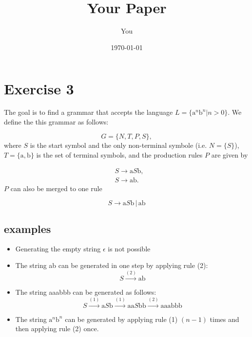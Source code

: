 \documentclass[a4paper]{article}
\title{Your Paper}
\author{You}
\date{\today}
\begin{document}
\section*{Exercise 3}
The goal is to find a grammar that accepts the language $L = \{\text{a}^n\text{b}^n \vert n > 0\}$. 
We define the this grammar as follows:

$$G = \{N, T, P, S\},$$
where $S$ is the start symbol and the only non-terminal symbole (i.e. $N = \{S\}$), $T = \{\text{a},\text{b}\}$ is the set of terminal symbols, and the production rules $P$ are given by

\begin{align}
 &S \longrightarrow \text{a}S\text{b}, \\
 &S \longrightarrow \text{ab}.
\end{align}
$P$ can also be merged to one rule

$$S \longrightarrow \text{a}S\text{b} \, \vert \, \text{ab}$$

\subsection*{examples}
\begin{itemize}
 \item Generating the empty string $\epsilon$ is not possible
 \item The string ab can be generated in one step by applying rule (2): $$S \stackrel{(2)}{\longrightarrow} \text{ab}$$
 \item The string aaabbb can be generated as follows: $$S \stackrel{(1)}{\longrightarrow} \text{a}S\text{b} \stackrel{(1)}{\longrightarrow} \text{aa}S\text{bb} \stackrel{(2)}{\longrightarrow} \text{aaa}\text{bbb}$$
 \item The string $\text{a}^n\text{b}^n$ can be generated by applying rule (1) $(n-1)$ times and then applying rule (2) once.
\end{itemize}
\end{document}
